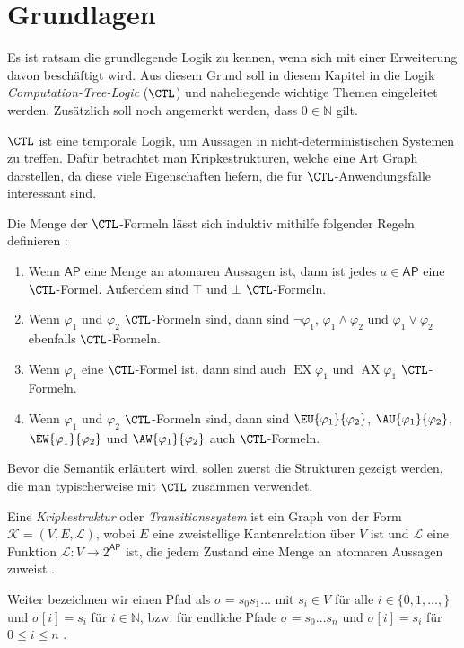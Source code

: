 \section{Grundlagen}
\label{ChapGrundlagen}

Es ist ratsam die grundlegende Logik zu kennen, wenn sich mit einer Erweiterung davon beschäftigt wird. Aus diesem Grund soll in diesem Kapitel in die Logik \textit{Computation-Tree-Logic} ($\CTL$) und naheliegende wichtige Themen eingeleitet werden.
Zusätzlich soll noch angemerkt werden, dass $0\in \mathbb{N}$ gilt.

$\CTL$ ist eine temporale Logik, um Aussagen in nicht-deterministischen Systemen zu treffen. 
Dafür betrachtet man Kripkestrukturen, welche eine Art Graph darstellen, da diese viele Eigenschaften liefern, die für $\CTL$-Anwendungsfälle interessant sind.

\begin{definition}
	Die Menge der $\CTL$-Formeln lässt sich induktiv mithilfe folgender Regeln definieren \cite{clarke1982design, baier2008principles}:
	\begin{enumerate}
		\item Wenn $\mathsf{AP}$ eine Menge an atomaren Aussagen ist, dann ist jedes $a\in \mathsf{AP}$ eine $\CTL$-Formel. Außerdem sind $\top$ und $\bot$ $\CTL$-Formeln.
		\item Wenn $\varphi_1$ und $\varphi_2$ $\CTL$-Formeln sind, dann sind $\neg\varphi_1$, $\varphi_1 \land \varphi_2$ und $\varphi_1 \lor \varphi_2$ ebenfalls $\CTL$-Formeln.
		\item Wenn $\varphi_1$ eine $\CTL$-Formel ist, dann sind auch $\operatorname{EX}\varphi_1$ und $\operatorname{AX}\varphi_1$ $\CTL$-Formeln.
		\item Wenn $\varphi_1$ und $\varphi_2$ $\CTL$-Formeln sind, dann sind $\EU{\varphi_1}{\varphi_2}$, $\AU{\varphi_1}{\varphi_2}$, $\EW{\varphi_1}{\varphi_2}$ und $\AW{\varphi_1}{\varphi_2}$ auch $\CTL$-Formeln.
	\end{enumerate}
\end{definition}

Bevor die Semantik erläutert wird, sollen zuerst die Strukturen gezeigt werden, die man typischerweise mit $\CTL$ zusammen verwendet.

\begin{definition}[Kripkestrukturen]
	\label{DefKripkeStruk}
	Eine \textit{Kripkestruktur} oder \textit{Transitionssystem} ist ein Graph von der Form $\mathcal{K}=(V, E, \mathcal{L})$, wobei $E$ eine zweistellige Kantenrelation über $V$ ist und $\mathcal{L}$ eine Funktion $\mathcal{L}:V\to2^{\mathsf{AP}}$ ist, die jedem Zustand eine Menge an atomaren Aussagen zuweist 	\cite{clarke1982design,clarke1986automatic}.
	
	Weiter bezeichnen wir einen Pfad als $\sigma=s_0 s_1 \dots$ mit $s_i\in V$ für alle $i\in\{0, 1,\dots,\}$ und $\sigma[i]=s_i$ für $i\in \mathbb{N}$, bzw. für endliche Pfade $\sigma = s_0 \dots s_n$ und $\sigma[i] = s_i$ für $0\leq i \leq n$ \cite{baier2008principles}.
\end{definition}

